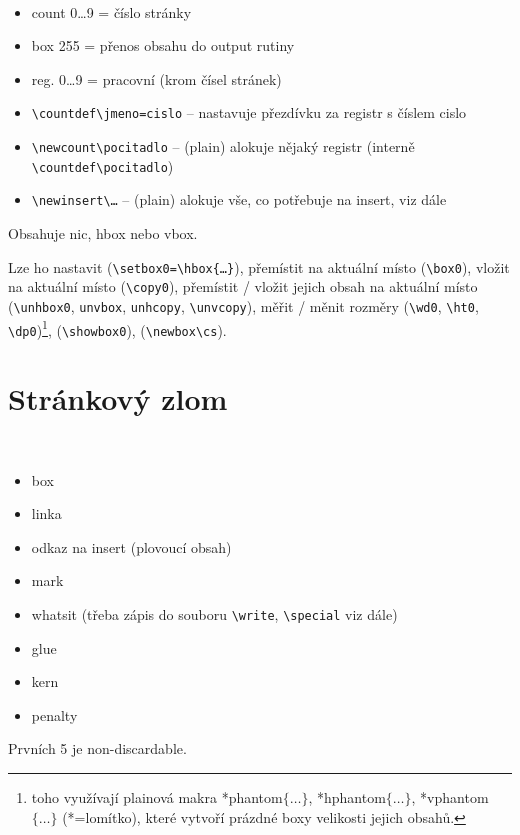 \documentclass[12pt]{article}					%
\begin{document}
    \begin{definice}
        \ 
        \begin{itemize}
            \item count 0…9 = číslo stránky
            \item box 255 = přenos obsahu do output rutiny
            \item reg. 0…9 = pracovní (krom čísel stránek)
            \item \verb|\countdef\jmeno=cislo| -- nastavuje přezdívku za registr s číslem cislo
            \item \verb|\newcount\pocitadlo| -- (plain) alokuje nějaký registr (interně \verb|\countdef\pocitadlo|)
            \item \verb|\newinsert\…| -- (plain) alokuje vše, co potřebuje na insert, viz dále 
        \end{itemize}
    \end{definice}

    \begin{definice}
        Obsahuje nic, hbox nebo vbox.

        Lze ho nastavit (\verb|\setbox0=\hbox{…}|), přemístit na aktuální místo (\verb|\box0|), vložit na aktuální místo (\verb|\copy0|), přemístit / vložit jejich obsah na aktuální místo (\verb|\unhbox0|, \verb|unvbox|, \verb|unhcopy|, \verb|\unvcopy|), měřit / měnit rozměry (\verb|\wd0|, \verb|\ht0|, \verb|\dp0|)\footnote{toho využívají plainová makra *phantom$\{…\}$, *hphantom$\{…\}$, *vphantom$\{…\}$ (*=lomítko), které vytvoří prázdné boxy velikosti jejich obsahů.}, (\verb|\showbox0|), (\verb|\newbox\cs|).
    \end{definice}

\section{Stránkový zlom}

    \begin{definice}
        \ 
        \begin{itemize}
            \item box
            \item linka
            \item odkaz na insert (plovoucí obsah)
            \item mark
            \item whatsit (třeba zápis do souboru \verb|\write|, \verb|\special| viz dále)
            \item glue
            \item kern
            \item penalty
        \end{itemize}

        Prvních 5 je non-discardable.
    \end{definice}
\end{document}
